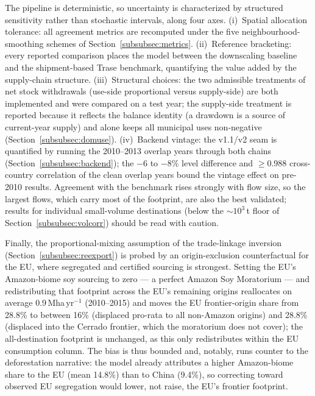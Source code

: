 \documentclass[pdflatex,sn-nature]{sn-jnl}%
\begin{document}
The pipeline is deterministic, so uncertainty is characterized by structured
sensitivity rather than stochastic intervals, along four axes. (i)~Spatial
allocation tolerance: all agreement metrics are recomputed under the five
neighbourhood-smoothing schemes of Section~\ref{subsubsec:metrics}.
(ii)~Reference bracketing: every reported comparison places the model
between the downscaling baseline and the shipment-based
Trase benchmark, quantifying the value added by the supply-chain
structure. (iii)~Structural choices: the two admissible treatments
of net stock withdrawals (use-side proportional versus supply-side) are both
implemented and were compared on a test year; the supply-side treatment is
reported because it reflects the balance identity (a drawdown is a source of
current-year supply) and alone keeps all municipal uses non-negative
(Section~\ref{subsubsec:domuse}). (iv)~Backend vintage: the v1.1/v2 seam is
quantified by running the 2010--2013 overlap years through both chains
(Section~\ref{subsubsec:backend}); the $-6$ to $-8\%$ level difference and
$\geq$0.988 cross-country correlation of the clean overlap years bound the
vintage effect on pre-2010 results.
Agreement with the benchmark rises strongly with flow size, so the largest
flows, which carry most of the footprint, are also the best validated; results
for individual small-volume destinations (below the $\sim$$10^3$\,t floor of
Section~\ref{subsubsec:volcorr}) should be read with caution.

Finally, the proportional-mixing assumption of the trade-linkage inversion
(Section~\ref{subsubsec:reexport}) is probed by an origin-exclusion
counterfactual for the EU, where segregated and certified sourcing is
strongest. Setting the EU's Amazon-biome soy sourcing to zero --- a
perfect Amazon Soy Moratorium --- and redistributing that footprint across
the EU's remaining origins reallocates on average 0.9\,Mha\,yr$^{-1}$
(2010--2015) and moves the EU frontier-origin share from 28.8\% to between
16\% (displaced pro-rata to all non-Amazon origins) and 28.8\% (displaced
into the Cerrado frontier, which the moratorium does not cover); the
all-destination footprint is unchanged, as this only redistributes within
the EU consumption column. The bias is thus bounded and, notably, runs
counter to the deforestation narrative: the model already attributes a
higher Amazon-biome share to the EU (mean 14.8\%) than to China (9.4\%),
so correcting toward observed EU segregation would lower, not raise, the
EU's frontier footprint.

\end{document}
